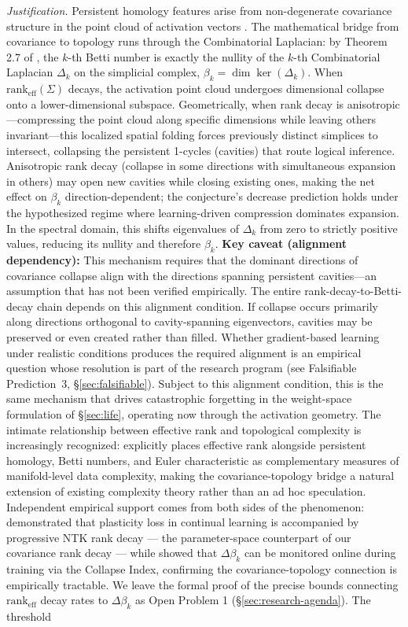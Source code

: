 \documentclass{article}
\begin{document}
\noindent\textit{Justification.} Persistent homology features arise from non-degenerate covariance structure in the point cloud of activation vectors \citep{otter2017roadmap}. The mathematical bridge from covariance to topology runs through the Combinatorial Laplacian: by Theorem 2.7 of \citet{Memoli2022persistent}, the $k$-th Betti number is exactly the nullity of the $k$-th Combinatorial Laplacian $\Delta_k$ on the simplicial complex, $\beta_k = \dim \ker(\Delta_k)$. When $\text{rank}_{\text{eff}}(\Sigma)$ decays, the activation point cloud undergoes dimensional collapse onto a lower-dimensional subspace. Geometrically, when rank decay is anisotropic—compressing the point cloud along specific dimensions while leaving others invariant—this localized spatial folding forces previously distinct simplices to intersect, collapsing the persistent 1-cycles (cavities) that route logical inference. Anisotropic rank decay (collapse in some directions with simultaneous expansion in others) may open new cavities while closing existing ones, making the net effect on $\beta_k$ direction-dependent; the conjecture's decrease prediction holds under the hypothesized regime where learning-driven compression dominates expansion. In the spectral domain, this shifts eigenvalues of $\Delta_k$ from zero to strictly positive values, reducing its nullity and therefore $\beta_k$. \textbf{Key caveat (alignment dependency):} This mechanism requires that the dominant directions of covariance collapse align with the directions spanning persistent cavities---an assumption that has not been verified empirically. The entire rank-decay-to-Betti-decay chain depends on this alignment condition. If collapse occurs primarily along directions orthogonal to cavity-spanning eigenvectors, cavities may be preserved or even created rather than filled. Whether gradient-based learning under realistic conditions produces the required alignment is an empirical question whose resolution is part of the research program (see Falsifiable Prediction~3, \S\ref{sec:falsifiable}). Subject to this alignment condition, this is the same mechanism that drives catastrophic forgetting in the weight-space formulation of \S\ref{sec:life}, operating now through the activation geometry. The intimate relationship between effective rank and topological complexity is increasingly recognized: \citet{Pere2025datacomplexity} explicitly places effective rank alongside persistent homology, Betti numbers, and Euler characteristic as complementary measures of manifold-level data complexity, making the covariance-topology bridge a natural extension of existing complexity theory rather than an ad hoc speculation. Independent empirical support comes from both sides of the phenomenon: \citet{Tang2025cchain} demonstrated that plasticity loss in continual learning is accompanied by progressive NTK rank decay --- the parameter-space counterpart of our covariance rank decay --- while \citet{Kalinowski2026collapse} showed that $\Delta \beta_k$ can be monitored online during training via the Collapse Index, confirming the covariance-topology connection is empirically tractable. We leave the formal proof of the precise bounds connecting $\text{rank}_{\text{eff}}$ decay rates to $\Delta \beta_k$ as Open Problem 1 (\S\ref{sec:research-agenda}). The threshold 
\end{document}

